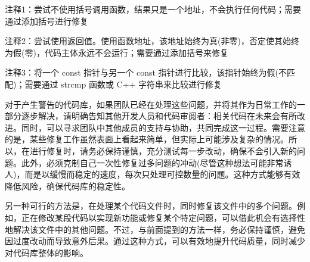 {\footnotesize
注释1：尝试不使用括号调用函数，结果只是一个地址，不会执行任何代码；需要通过添加括号进行修复

注释2：尝试使用返回值。使用函数地址，该地址始终为真(非零)，否定使其始终为假(零)，代码主体永远不会运行；需要通过添加括号来修复

注释3：将一个 const 指针与另一个 const 指针进行比较，该指针始终为假(不匹配)；需要通过 strcmp 函数或 C++ 字符串来比较进行修复
}

对于产生警告的代码库，如果团队已经在处理这些问题，并将其作为日常工作的一部分逐步解决，请明确告知其他开发人员和代码审阅者：相关代码在未来会有所改进。同时，可以寻求团队中其他成员的支持与协助，共同完成这一过程。需要注意的是，某些修复工作虽然表面上看起来简单，但实际上可能涉及复杂的情况。所以，在进行修复时，请务必保持谨慎，充分测试每一步改动，确保不会引入新的问题。此外，必须克制自己一次性修复过多问题的冲动(尽管这种想法可能非常诱人)，而是以缓慢而稳定的速度，每次只处理可控数量的问题。这种方式能够有效降低风险，确保代码库的稳定性。

另一种可行的方法是，在处理某个代码文件时，同时修复该文件中的多个问题。例如，正在修改某段代码以实现新功能或修复某个特定问题，可以借此机会有选择性地解决该文件中的其他问题。不过，与前面提到的方法一样，务必保持谨慎，避免因过度改动而导致意外后果。通过这种方式，可以有效地提升代码质量，同时减少对代码库整体的影响。



















